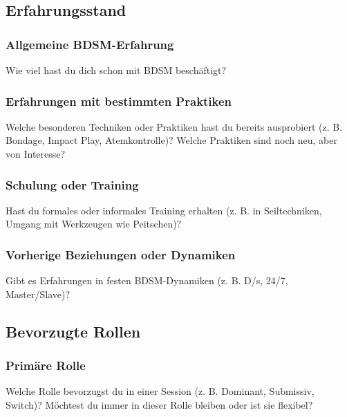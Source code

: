 \documentclass[a4paper,12pt]{article}
\begin{document}
\subsection{Erfahrungsstand}
\subsubsection{Allgemeine BDSM-Erfahrung}
Wie viel hast du dich schon mit BDSM beschäftigt?\bigbreak
\begin{Form}
\end{Form}
\newline

\subsubsection{Erfahrungen mit bestimmten Praktiken}
\noindent Welche besonderen Techniken oder Praktiken hast du bereits ausprobiert (z. B. Bondage, Impact Play, Atemkontrolle)? Welche Praktiken sind noch neu, aber von Interesse? \newline
\noindent \TextField[name=ErfahrungPraktiken,multiline=true,height=16em, width=37em]{}

\subsubsection{Schulung oder Training}
\noindent Hast du formales oder informales Training erhalten (z. B. in Seiltechniken, Umgang mit Werkzeugen wie Peitschen)? \newline
\noindent \TextField[name=ErfahrungTraining,multiline=true,height=7em, width=37em]{}

\subsubsection{Vorherige Beziehungen oder Dynamiken}
\noindent Gibt es Erfahrungen in festen BDSM-Dynamiken (z. B. D/s, 24/7, Master/Slave)? \newline
\noindent \TextField[name=ErfahrungDynamiken,multiline=true,height=7em, width=37em]{}

\newpage
\subsection{Bevorzugte Rollen}
\subsubsection{Primäre Rolle}
\noindent Welche Rolle bevorzugst du in einer Session (z. B. Dominant, Submissiv, Switch)? Möchtest du immer in dieser Rolle bleiben oder ist sie flexibel?\newline
\noindent \TextField[name=ErfahrungPrefRolle,multiline=true,height=7em, width=37em]{}
\end{document}
